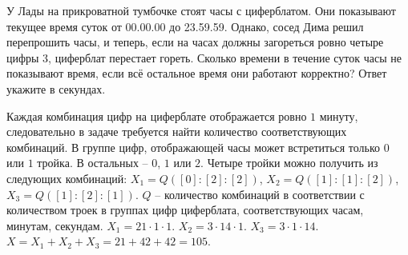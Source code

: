 
У Лады на прикроватной тумбочке стоят часы с циферблатом. Они показывают текущее время суток от 00.00.00 до 23.59.59. Однако, сосед Дима решил перепрошить часы, и теперь, если на часах должны загореться ровно четыре цифры 3, циферблат перестает гореть. Сколько времени в течение суток часы не показывают время, если всё остальное время они работают корректно? Ответ укажите в секундах.

\solutionSection

Каждая комбинация цифр на циферблате отображается ровно $1$ минуту, следовательно в задаче требуется найти количество соответствующих комбинаций. В группе цифр, отображающей часы может встретиться только $0$ или $1$ тройка. В остальных -- $0$, $1$ или $2$. Четыре тройки можно получить из следующих комбинаций: $X_1 = Q([0]:[2]:[2])$, $X_2 = Q([1]:[1]:[2])$, $X_3 = Q([1]:[2]:[1])$. $Q$ -- количество комбинаций в соответствии с количеством троек в группах цифр циферблата, соответствующих часам, минутам, секундам. $X_1 = 21 \cdot 1 \cdot 1$. $X_2 = 3 \cdot 14 \cdot 1$. $X_3 = 3 \cdot 1 \cdot 14$. $X = X_1 + X_2 + X_3 = 21 + 42 + 42 = 105$.

